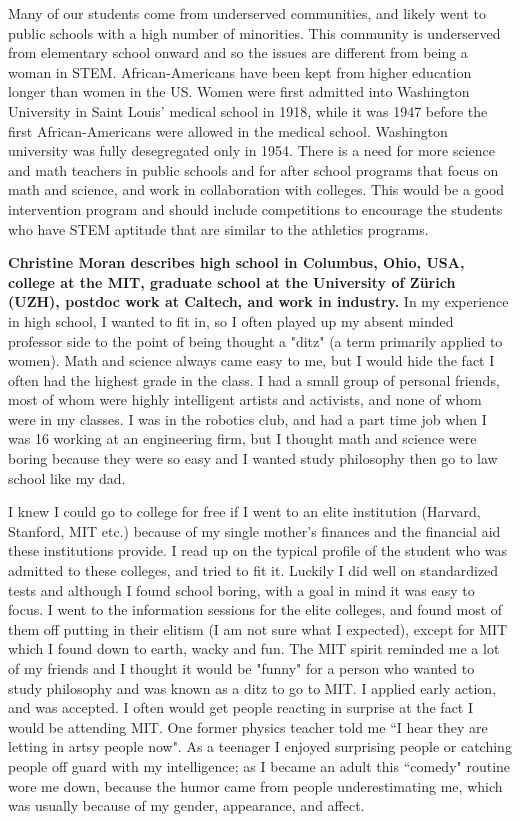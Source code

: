 \documentclass[utf8]{frontiersSCNS} %
\begin{document}
Many of our students come from underserved communities, and likely went to public schools with a high number of minorities. This community is underserved from elementary school onward and so the issues are different from being a woman in STEM.  African-Americans have been kept from higher education longer than women in the US. Women were first admitted into Washington University in Saint Louis' medical school in 1918, while it was 1947 before the first African-Americans were allowed in the medical school. Washington university was fully desegregated only in 1954. There is a need for more science and math teachers in public schools and for after school programs that focus on math and science, and work in collaboration with colleges. This would be a good intervention program and should include competitions to encourage the students who have STEM aptitude that are similar to the athletics programs.


{\bf Christine Moran describes high school in Columbus, Ohio, USA, college at the MIT, graduate school at the University of Z\"{u}rich (UZH), postdoc work at Caltech, and work in industry.}
In my experience in high school, I wanted to fit in, so I often played up my absent minded professor side to the point of being thought a "ditz" (a term primarily applied to women). Math and science always came easy to me, but I would hide the fact I often had the highest grade in the class. I had a small group of personal friends, most of whom were highly intelligent artists and activists, and none of whom were in my classes. I was in the robotics club, and had a part time job when I was 16 working at an engineering firm, but I thought math and science were boring because they were so easy and I wanted study philosophy then go to law school like my dad. 

I knew I could go to college for free if I went to an elite institution (Harvard, Stanford, MIT etc.) because of my single mother's finances and the financial aid these institutions provide. I read up on the typical profile of the student who was admitted to these colleges, and tried to fit it. Luckily I did well on standardized tests and although I found school boring, with a goal in mind it was easy to focus. I went to the information sessions for the elite colleges, and found most of them off putting in their elitism (I am not sure what I expected), except for MIT which I found down to earth, wacky and fun. The MIT spirit reminded me a lot of my friends and I thought it would be "funny" for a person who wanted to study philosophy and was known as a ditz to go to MIT. I applied early action, and was accepted. I often would get people reacting in surprise at the fact I would be attending MIT. One former physics teacher told me ``I hear they are letting in artsy people now". As a teenager I enjoyed surprising people or catching people off guard with my intelligence; as I became an adult this ``comedy" routine wore me down, because the humor came from people underestimating me, which was usually because of my gender, appearance, and affect. 
\end{document}
